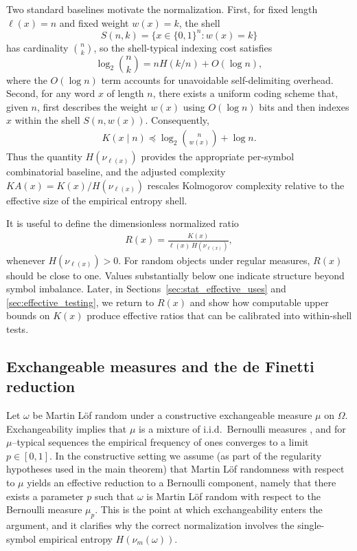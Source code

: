 \documentclass[12pt]{article}
\newcommand{\be}{\begin{eqnarray}}
\newcommand{\ee}{\end{eqnarray}}
\newcommand{\dom}{\preceq}
\begin{document}
Two standard baselines motivate the normalization. First, for fixed length
$\ell(x)=n$ and fixed weight $w(x)=k$, the shell
$$
S(n,k)=\{x\in\{0,1\}^n : w(x)=k\}
$$
has cardinality $\binom{n}{k}$, so the shell-typical indexing cost satisfies
$$
\log_2\binom{n}{k}
=
nH(k/n)+O(\log n),
$$
where the $O(\log n)$ term accounts for unavoidable self-delimiting overhead.
Second, for any word $x$ of length $n$, there exists a uniform coding scheme
that, given $n$, first describes the weight $w(x)$ using $O(\log n)$ bits and
then indexes $x$ within the shell $S(n,w(x))$. Consequently,
\begin{eqnarray}
K(x\mid n)
\dom
\log_2\binom{n}{w(x)}+\log n.
\label{eq:K_upper_shell}
\end{eqnarray}
Thus the quantity $H(\nu_{\ell(x)})$ provides the appropriate per-symbol
combinatorial baseline, and the adjusted complexity
$KA(x)=K(x)/H(\nu_{\ell(x)})$ rescales Kolmogorov complexity relative to the
effective size of the empirical entropy shell.


It is useful to define the dimensionless normalized ratio
\be
R(x)=\frac{K(x)}{\ell(x)\,H(\nu_{\ell(x)})},
\label{eq:R_def_main}
\ee
whenever $H(\nu_{\ell(x)})>0$. For random objects under regular measures, $R(x)$ should be close to one. Values substantially below one indicate structure beyond symbol imbalance. Later, in Sections~\ref{sec:stat_effective_uses} and \ref{sec:effective_testing}, we return to $R(x)$ and show how computable upper bounds on $K(x)$ produce effective ratios that can be calibrated into within-shell tests.

\subsection*{Exchangeable measures and the de Finetti reduction}

Let $\omega$ be Martin L\"of random under a constructive exchangeable measure $\mu$ on $\Omega$.
Exchangeability implies that $\mu$ is a mixture of i.i.d.\ Bernoulli measures \citep{deFinetti1937,DiaconisFreedman1980}, and for $\mu$--typical sequences the empirical frequency of ones converges to a limit $p\in[0,1]$.
In the constructive setting we assume (as part of the regularity hypotheses used in the main theorem) that Martin L\"of randomness with respect to $\mu$ yields an effective reduction to a Bernoulli component, namely that there exists a parameter $p$ such that $\omega$ is Martin L\"of random with respect to the Bernoulli measure $\mu_p$. This is the point at which exchangeability enters the argument, and it clarifies why the correct normalization involves the single-symbol empirical entropy $H(\nu_m(\omega))$.
\end{document}
